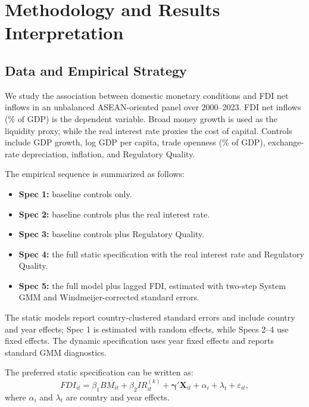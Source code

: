 \chapter{Methodology and Results Interpretation}
\label{chap:methodology-results-interpretation}

\section{Data and Empirical Strategy}
\label{sec:data-empirical-strategy}

We study the association between domestic monetary conditions and FDI net inflows in an unbalanced ASEAN-oriented panel over 2000--2023. FDI net inflows (\% of GDP) is the dependent variable. Broad money growth is used as the liquidity proxy, while the real interest rate proxies the cost of capital. Controls include GDP growth, log GDP per capita, trade openness (\% of GDP), exchange-rate depreciation, inflation, and Regulatory Quality.

The empirical sequence is summarized as follows:
\begin{itemize}
    \item \textbf{Spec 1:} baseline controls only.
    \item \textbf{Spec 2:} baseline controls plus the real interest rate.
    \item \textbf{Spec 3:} baseline controls plus Regulatory Quality.
    \item \textbf{Spec 4:} the full static specification with the real interest rate and Regulatory Quality.
    \item \textbf{Spec 5:} the full model plus lagged FDI, estimated with two-step System GMM and Windmeijer-corrected standard errors.
\end{itemize}

The static models report country-clustered standard errors and include country and year effects; Spec 1 is estimated with random effects, while Specs 2--4 use fixed effects. The dynamic specification uses year fixed effects and reports standard GMM diagnostics.

The preferred static specification can be written as:
\begin{equation}
    FDI_{it} = \beta_1 BM_{it} + \beta_2 IR_{it}^{(k)} + \boldsymbol{\gamma}'\mathbf{X}_{it} + \alpha_i + \lambda_t + \varepsilon_{it},
\end{equation}
where $\alpha_i$ and $\lambda_t$ are country and year effects.

